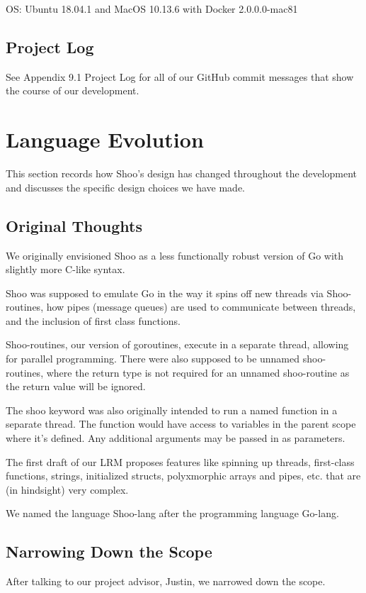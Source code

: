 \documentclass[12pt]{article}
\begin{document}
OS: Ubuntu 18.04.1 and MacOS 10.13.6 with Docker 2.0.0.0-mac81

\subsection{Project Log}
See Appendix 9.1 Project Log for all of our GitHub commit messages that show the course of our development. 

\section{Language Evolution}
This section records how Shoo's design has changed throughout the development and discusses the specific design choices we have made.

\subsection{Original Thoughts}
We originally envisioned Shoo as a less functionally robust version of Go with slightly more C-like syntax. 

Shoo was supposed to emulate Go in the way it spins off new threads via Shoo-routines, how pipes (message queues) are used to communicate between threads, and the inclusion of first class functions. 

Shoo-routines, our version of goroutines, execute in a separate thread, allowing for parallel programming. There were also supposed to be unnamed shoo-routines, where the return type is not required for an unnamed shoo-routine as the return value will be ignored.

The shoo keyword was also originally intended to run a named function in a separate thread. The function would have access to variables in the parent scope where it's defined. Any additional arguments may be passed in as parameters. 

The first draft of our LRM proposes features like spinning up threads, first-class functions, strings, initialized structs, polyxmorphic arrays and pipes, etc. that are (in hindsight) very complex.

We named the language Shoo-lang after the programming language Go-lang.

\subsection{Narrowing Down the Scope}

After talking to our project advisor, Justin, we narrowed down the scope. 
\end{document}
